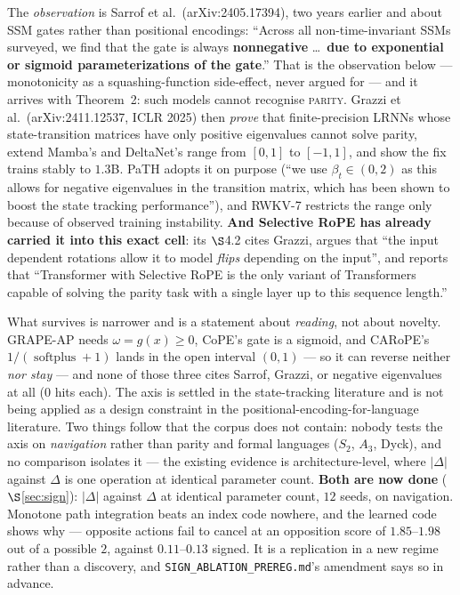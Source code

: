 \documentclass[11pt]{article}
\DeclareMathOperator{\softplus}{softplus}
\begin{document}
The \emph{observation} is Sarrof et al.\ (arXiv:2405.17394), two years earlier and
about SSM gates rather than positional encodings: ``Across all non-time-invariant
SSMs surveyed, we find that the gate is always \textbf{nonnegative} \dots\
\textbf{due to exponential or sigmoid parameterizations of the gate}.'' That is
the observation below --- monotonicity as a squashing-function side-effect, never
argued for --- and it arrives with Theorem~2: such models cannot recognise
\textsc{parity}. Grazzi et al.\ (arXiv:2411.12537, ICLR 2025) then \emph{prove}
that finite-precision LRNNs whose state-transition matrices have only positive
eigenvalues cannot solve parity, extend Mamba's and DeltaNet's range from $[0,1]$
to $[-1,1]$, and show the fix trains stably to $1.3$B. PaTH adopts it on purpose
(``we use $\beta_t\in(0,2)$ as this allows for negative eigenvalues in the
transition matrix, which has been shown to boost the state tracking
performance''), and RWKV-7 restricts the range only because of observed training
instability. \textbf{And Selective RoPE has already carried it into this exact
cell}: its $\S$4.2 cites Grazzi, argues that ``the input dependent rotations allow
it to model \emph{flips} depending on the input'', and reports that ``Transformer
with Selective RoPE is the only variant of Transformers capable of solving the
parity task with a single layer up to this sequence length.''

What survives is narrower and is a statement about \emph{reading}, not about
novelty. GRAPE-AP needs $\omega=g(x)\ge0$, CoPE's gate is a sigmoid, and CARoPE's
$1/(\softplus+1)$ lands in the open interval $(0,1)$ --- so it can reverse neither
\emph{nor stay} --- and none of those three cites Sarrof, Grazzi, or negative
eigenvalues at all ($0$ hits each). The axis is settled in the state-tracking
literature and is not being applied as a design constraint in the
positional-encoding-for-language literature. Two things follow that the corpus
does not contain: nobody tests the axis on \emph{navigation} rather than parity
and formal languages ($S_2$, $A_3$, Dyck), and no comparison isolates it --- the
existing evidence is architecture-level, where $|\Delta|$ against $\Delta$ is one
operation at identical parameter count. \textbf{Both are now done} ($\S$\ref{sec:sign}): $|\Delta|$ against $\Delta$ at
identical parameter count, $12$ seeds, on navigation. Monotone path integration
beats an index code nowhere, and the learned code shows why --- opposite actions
fail to cancel at an opposition score of $1.85$--$1.98$ out of a possible $2$,
against $0.11$--$0.13$ signed. It is a replication in a new regime rather than a
discovery, and \texttt{SIGN\_ABLATION\_PREREG.md}'s amendment says so in advance.
\end{document}
